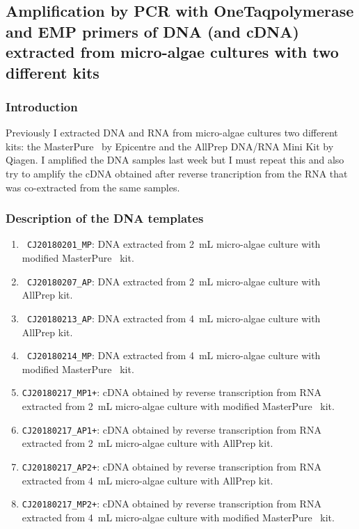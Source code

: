\subsection{Amplification by PCR with OneTaq\cR polymerase and EMP primers of DNA (and cDNA) extracted from micro-algae cultures with two different kits}
\label{task:20180217_cj1}

\subsubsection{Introduction}
Previously I extracted DNA and RNA from micro-algae cultures two different kits: the MasterPure\texttrademark~ by Epicentre and the AllPrep DNA/RNA Mini Kit by Qiagen. I amplified the DNA samples last week but I must repeat this and also try to amplify the cDNA obtained after reverse trancription from the RNA that was co-extracted from the same samples.

\subsubsection{Description of the DNA templates}
\begin{enumerate}
\item \texttt{{\color{Grass} CJ20180201\_MP}}: DNA extracted from 2~mL micro-algae culture with modified MasterPure\texttrademark~ kit.
\item \texttt{{\color{Aqua} CJ20180207\_AP}}: DNA extracted from 2~mL micro-algae culture with AllPrep kit.
\item \texttt{{\color{Lavender} CJ20180213\_AP}}: DNA extracted from 4~mL micro-algae culture with AllPrep kit.
\item \texttt{{\color{Sunflower} CJ20180214\_MP}}: DNA extracted from 4~mL micro-algae culture with modified MasterPure\texttrademark~ kit.
\item \texttt{CJ20180217\_MP1+}: cDNA obtained by reverse transcription  from RNA extracted from 2~mL micro-algae culture with modified MasterPure\texttrademark~ kit. 
\item \texttt{CJ20180217\_AP1+}: cDNA obtained by reverse transcription from RNA extracted from 2~mL micro-algae culture with AllPrep kit. 
\item \texttt{CJ20180217\_AP2+}: cDNA obtained by reverse transcription from RNA extracted from 4~mL micro-algae culture with AllPrep kit. 
\item \texttt{CJ20180217\_MP2+}: cDNA obtained by reverse transcription from RNA extracted from 4~mL micro-algae culture with modified MasterPure\texttrademark~ kit. 
\end{enumerate}

